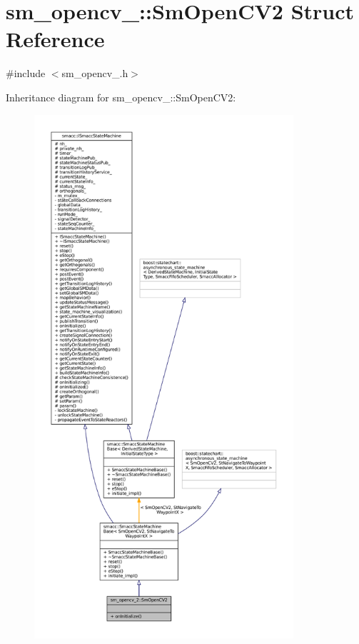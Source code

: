 \hypertarget{structsm__opencv__2_1_1SmOpenCV2}{}\section{sm\+\_\+opencv\+\_\+:\+:Sm\+Open\+C\+V2 Struct Reference}
\label{structsm__opencv__2_1_1SmOpenCV2}


{\ttfamily \#include $<$sm\+\_\+opencv\+\_.\+h$>$}



Inheritance diagram for sm\+\_\+opencv\+\_\+:\+:Sm\+Open\+C\+V2\+:
\nopagebreak
\begin{figure}[H]
\begin{center}
\leavevmode
\includegraphics[height=550pt]{structsm__opencv__2_1_1SmOpenCV2__inherit__graph}
\end{center}
\end{figure}


